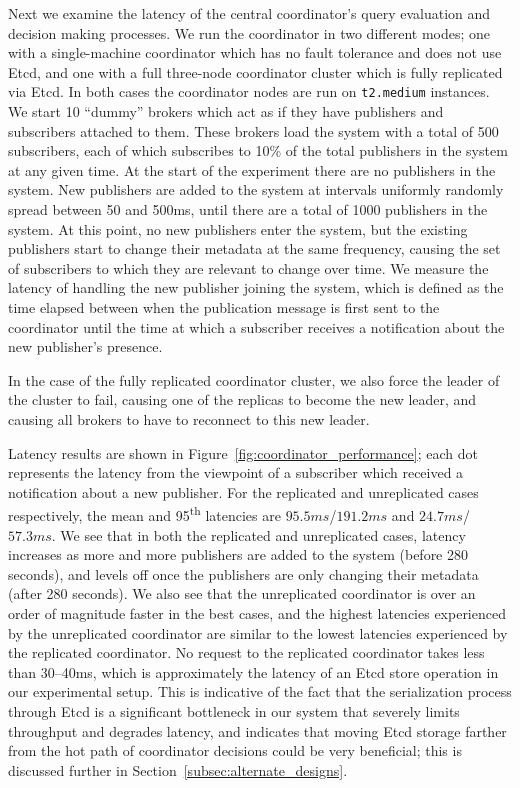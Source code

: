 Next we examine the latency of the central coordinator's query evaluation and decision making processes.
We run the coordinator in two different modes; one with a single-machine coordinator which has no fault tolerance and does not use Etcd, and one with a full three-node coordinator cluster which is fully replicated via Etcd.
In both cases the coordinator nodes are run on \texttt{t2.medium} instances.
We start 10 ``dummy'' brokers which act as if they have publishers and subscribers attached to them.
These brokers load the system with a total of 500 subscribers, each of which subscribes to 10\% of the total publishers in the system at any given time.
At the start of the experiment there are no publishers in the system.
New publishers are added to the system at intervals uniformly randomly spread between 50 and 500ms, until there are a total of 1000 publishers in the system.
At this point, no new publishers enter the system, but the existing publishers start to change their metadata at the same frequency, causing the set of subscribers to which they are relevant to change over time.
We measure the latency of handling the new publisher joining the system, which is defined as the time elapsed between when the publication message is first sent to the coordinator until the time at which a subscriber receives a notification about the new publisher's presence.

In the case of the fully replicated coordinator cluster, we also force the leader of the cluster to fail, causing one of the replicas to become the new leader, and causing all brokers to have to reconnect to this new leader.

Latency results are shown in Figure~\ref{fig:coordinator_performance}; each dot represents the latency from the viewpoint of a subscriber which received a notification about a new publisher.
For the replicated and unreplicated cases respectively, the mean and 95\textsuperscript{th} latencies are $95.5ms$/$191.2ms$ and $24.7ms$/$57.3ms$.
We see that in both the replicated and unreplicated cases, latency increases as more and more publishers are added to the system (before 280 seconds), and levels off once the publishers are only changing their metadata (after 280 seconds).
We also see that the unreplicated coordinator is over an order of magnitude faster in the best cases, and the highest latencies experienced by the unreplicated coordinator are similar to the lowest latencies experienced by the replicated coordinator.
No request to the replicated coordinator takes less than 30--40ms, which is approximately the latency of an Etcd store operation in our experimental setup.
This is indicative of the fact that the serialization process through Etcd is a significant bottleneck in our system that severely limits throughput and degrades latency, and indicates that moving Etcd storage farther from the hot path of coordinator decisions could be very beneficial; this is discussed further in Section~\ref{subsec:alternate_designs}.

